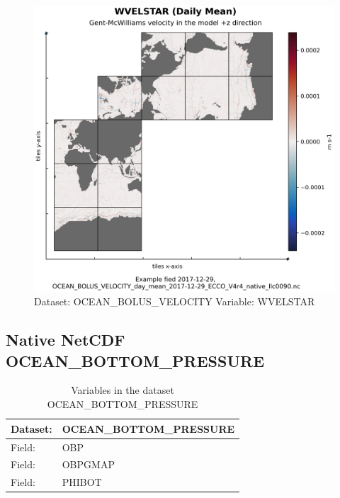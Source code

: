 \begin{figure}[H]
\centering
\includegraphics[width=\textwidth]{../images/plots/native_plots/Gent-McWilliams_Ocean_Bolus_Velocity/WVELSTAR.png}
\caption{Dataset: OCEAN\_BOLUS\_VELOCITY Variable: WVELSTAR}
\label{tab:table-OCEAN_BOLUS_VELOCITY_WVELSTAR-Plot}
\end{figure}
\pagebreak
\subsection{Native NetCDF OCEAN\_BOTTOM\_PRESSURE}
\newp
\begin{longtable}{|p{}|p{}|}
\caption{Variables in the dataset OCEAN\_BOTTOM\_PRESSURE}
\label{tab:table-OCEAN_BOTTOM_PRESSURE-fields} \\ 
\hline \endhead \hline \endfoot
\rowcolor{lightgray} \textbf{Dataset:} & \textbf{OCEAN\_BOTTOM\_PRESSURE} \\ \hline
Field: &OBP \\ \hline
Field: &OBPGMAP \\ \hline
Field: &PHIBOT \\ \hline
\end{longtable}

\pagebreak
